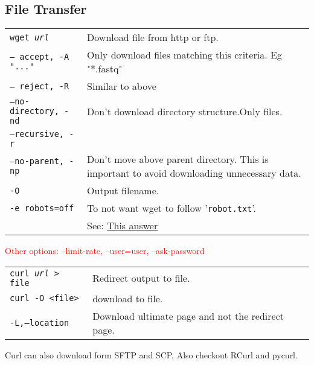 \vfill\null
\columnbreak


\subsection{File Transfer}

\begin{tabularx}{\linewidth}{lX}
\hline
\texttt{wget \textit{url}} & Download file from http or ftp.\\
\texttt{-- accept, -A "..."} & Only download files matching this criteria. Eg "*.fastq"\\
\texttt{-- reject, -R} & Similar to above\\
\texttt{--no-directory, -nd} & Don't download directory structure.Only files.\\
\texttt{--recursive, -r} & \\
\texttt{--no-parent, -np} & Don't move above parent directory. This is important to avoid downloading unnecessary data.\\
\texttt{-O} & Output filename.\\
\texttt{-e robots=off} & To not want wget to follow '\texttt{robot.txt}'.\\
& See: \href{https://stackoverflow.com/a/11124664}{This answer} \\
\hline
\end{tabularx}

\textcolor{red}{Other options: --limit-rate, --user=user, --ask-password}\\


\begin{tabularx}{\linewidth}{lX}
\hline
\texttt{curl \textit{url} > file} & Redirect output to file.\\
\texttt{curl -O <file>} & download to file.\\
\texttt{-L,--location} & Download ultimate page and not the redirect page.\\
\hline
\end{tabularx}
Curl can also download form SFTP and SCP. Also checkout RCurl and pycurl.


\vfill \null
\columnbreak

